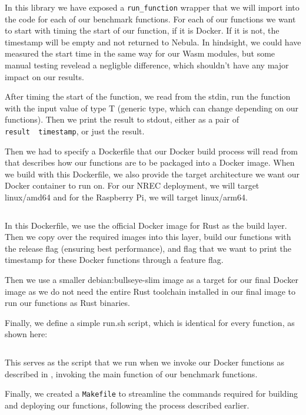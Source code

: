 \documentclass[
  table]{report}
\begin{document}
\inputminted{rust}{assets/code/shared_lib.rs}

In this library we have exposed a \texttt{run\_function} wrapper that we
will import into the code for each of our benchmark functions. For each
of our functions we want to start with timing the start of our function,
if it is Docker. If it is not, the timestamp will be empty and not
returned to Nebula. In hindsight, we could have measured the start time
in the same way for our \ac{Wasm} modules, but some manual testing
revelead a negligble difference, which shouldn't have any major impact
on our results.

After timing the start of the function, we read from the stdin, run the
function with the input value of type T (generic type, which can change
depending on our functions). Then we print the result to stdout, either
as a pair of \texttt{result\ \textbar{}\ timestamp}, or just the result.

Then we had to specify a Dockerfile that our Docker build process will
read from that describes how our functions are to be packaged into a
Docker image. When we build with this Dockerfile, we also provide the
target architecture we want our Docker container to run on. For our
\ac{NREC} deployment, we will target linux/amd64 and for the Raspberry
Pi, we will target linux/arm64.

\inputminted{toml}{assets/code/Dockerfile}

In this Dockerfile, we use the official Docker image for Rust as the
build layer. Then we copy over the required images into this layer,
build our functions with the release flag (ensuring best performance),
and flag that we want to print the timestamp for these Docker functions
through a feature flag.

Then we use a smaller debian:bullseye-slim image as a target for our
final Docker image as we do not need the entire Rust toolchain installed
in our final image to run our functions as Rust binaries.

Finally, we define a simple run.sh script, which is identical for every
function, as shown here:

\inputminted[firstline=2, lastline=4]{bash}{assets/code/commands.sh}

This serves as the script that we run when we invoke our Docker
functions as described in , invoking the main
function of our benchmark functions.

Finally, we created a \texttt{Makefile} to streamline the commands
required for building and deploying our functions, following the process
described earlier.
\end{document}
